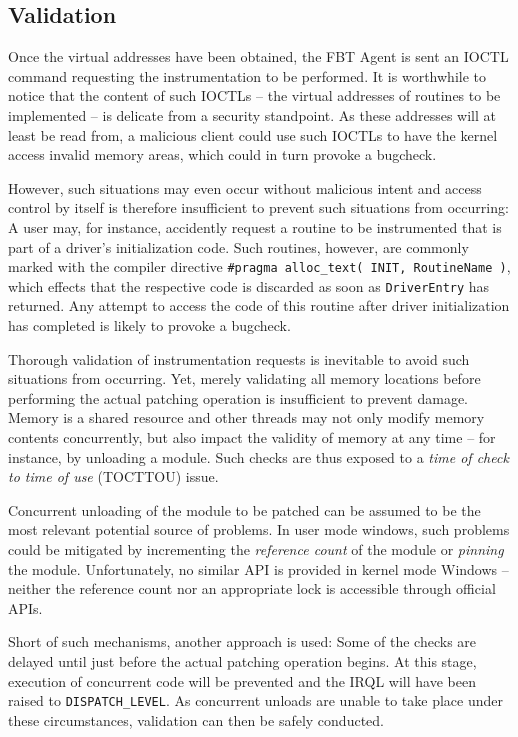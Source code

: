 \subsection{Validation}
Once the virtual addresses have been obtained, the FBT Agent is sent an IOCTL command
requesting the instrumentation to be performed. It is worthwhile to notice that
the content of such IOCTLs -- the virtual addresses of routines to be implemented --
is delicate from a security standpoint. As these addresses will at least be read 
from, a malicious client could use such IOCTLs to have the kernel access invalid 
memory areas, which could in turn provoke a bugcheck.

However, such situations may even occur without malicious intent and access control by itself
is therefore insufficient to prevent such situations from occurring: A user may, for instance, accidently request
a routine to be instrumented that is part of a driver's initialization code. Such routines,
however, are commonly marked with the compiler directive 
\verb|#pragma alloc_text( INIT, RoutineName )|, which effects that the respective code
is discarded as soon as \verb|DriverEntry| has returned. Any attempt to access the
code of this routine after driver initialization has completed is likely to provoke
a bugcheck.

Thorough validation of instrumentation requests is inevitable to avoid such situations
from occurring. Yet, merely validating all memory locations before performing the actual
patching operation is insufficient to prevent damage. Memory is a shared resource and 
other threads may not only modify memory contents concurrently, but also impact the 
validity of memory at any time -- for instance, by unloading a module. Such checks
are thus exposed to a \emph{time of check to time of use} (TOCTTOU) \cite{SecAssess06} issue.

Concurrent unloading of the module to be patched can be assumed to be the most relevant
potential source of problems. In user mode windows, such problems could be mitigated
by incrementing the \emph{reference count} of the module or \emph{pinning} the module. 
Unfortunately, no similar API is provided in kernel mode Windows -- neither the 
reference count nor an appropriate lock is accessible through official APIs.

Short of such mechanisms, another approach is used: Some of the checks
are delayed until just before the actual patching operation begins. At this stage,
execution of concurrent code will be prevented and the IRQL will have been raised 
to \verb|DISPATCH_LEVEL|. As concurrent unloads are unable to take place under 
these circumstances, validation can then be safely conducted.

